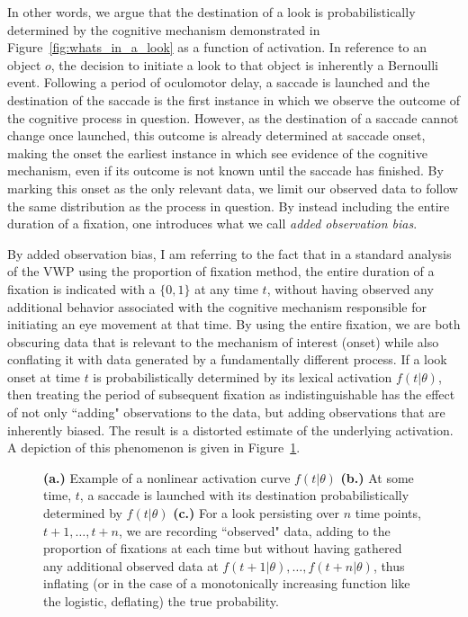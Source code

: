 In other words, we argue that the destination of a look is probabilistically determined by the cognitive mechanism demonstrated in Figure~\ref{fig:whats_in_a_look} as a function of activation. In reference to an object $o$, the decision to initiate a look to that object is inherently a Bernoulli event. Following a period of oculomotor delay, a saccade is launched and the destination of the saccade is the first instance in which we observe the outcome of the cognitive process in question. However, as the destination of a saccade cannot change once launched, this outcome is already determined at saccade onset, making the onset the earliest instance in which see evidence of the cognitive mechanism, even if its outcome is not known until the saccade has finished. By marking this onset as the only relevant data, we limit our observed data to follow the same distribution as the process in question. By instead including the entire duration of a fixation, one introduces what we call \textit{added observation bias}.

By added observation bias, I am referring to the fact that in a standard analysis of the VWP using the proportion of fixation method, the entire duration of a fixation is indicated with a $\{0,1\}$ at any time $t$, without having observed any additional behavior associated with the cognitive mechanism responsible for initiating an eye movement at that time. By using the entire fixation, we are both obscuring data that is relevant to the mechanism of interest (onset) while also conflating it with data generated by a fundamentally different process. If a look onset at time $t$ is probabilistically determined by its lexical activation $f(t|\theta)$, then treating the period of subsequent fixation as indistinguishable has the effect of not only ``adding" observations to the data, but adding observations that are inherently biased. The result is a distorted estimate of the underlying activation. A depiction of this phenomenon is given in Figure~\ref{fig:folly_of_fixation}.

\begin{figure}[H]
    \centering
    \caption{ \textbf{(a.)} Example of a nonlinear activation curve $f(t|\theta)$ \textbf{(b.)} At some time, $t$, a saccade is launched with its destination probabilistically determined by $f(t|\theta)$ \textbf{(c.)} For a look persisting over $n$ time points, $t+1, \dots, t+n$, we are recording ``observed" data, adding to the proportion of fixations at each time but without having gathered any additional observed data at $f(t+1 | \theta), \dots,f(t+n | \theta)$, thus inflating (or in the case of a monotonically increasing function like the logistic, deflating) the true probability. }
\label{fig:folly_of_fixation}
\end{figure}

